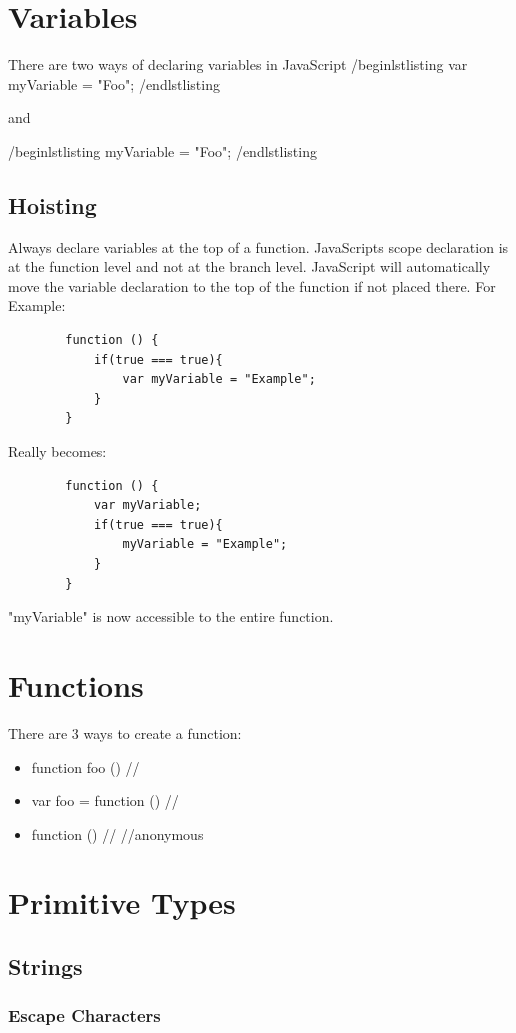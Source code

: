 \documentclass {amsart}
\begin{document}
\section{Variables}
	There are two ways of declaring variables in JavaScript 
	/begin{lstlisting}
		var myVariable = "Foo";
	/end{lstlisting}

	and 

	/begin{lstlisting}
		myVariable = "Foo";
	/end{lstlisting}
	\subsection{Hoisting}  Always declare variables at the top of a function.  JavaScripts scope declaration is at the function level and not at the branch level.  JavaScript will automatically move the variable declaration to the top of the function if not placed there. For Example: 
	\begin{lstlisting}
		function () {
			if(true === true){
				var myVariable = "Example";
			}
		}
	\end{lstlisting}

Really becomes: 

	\begin{lstlisting}
		function () {
			var myVariable; 
			if(true === true){
				myVariable = "Example";
			}
		}
	\end{lstlisting}
"myVariable" is now accessible to the entire function.  

\section{Functions}
	There are 3 ways to create a function: 
	\begin{itemize}
		\item function foo () /{/}
		\item var foo = function () /{/}
		\item function () /{/} //anonymous
	\end{itemize}


\section{Primitive Types}
	\subsection{Strings}
			\subsubsection{Escape Characters}
\end{document}
